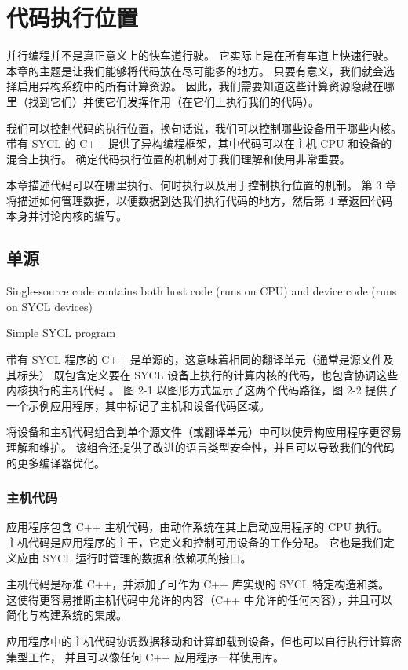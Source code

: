 \section{代码执行位置}
并行编程并不是真正意义上的快车道行驶。 它实际上是在所有车道上快速行驶。 本章的主题是让我们能够将代码放在尽可能多的地方。 
只要有意义，我们就会选择启用异构系统中的所有计算资源。 
因此，我们需要知道这些计算资源隐藏在哪里（找到它们）并使它们发挥作用（在它们上执行我们的代码）。

我们可以控制代码的执行位置，换句话说，我们可以控制哪些设备用于哪些内核。 
带有 SYCL 的 C++ 提供了异构编程框架，其中代码可以在主机 CPU 和设备的混合上执行。 
确定代码执行位置的机制对于我们理解和使用非常重要。

本章描述代码可以在哪里执行、何时执行以及用于控制执行位置的机制。 
第 3 章将描述如何管理数据，以便数据到达我们执行代码的地方，然后第 4 章返回代码本身并讨论内核的编写。


\subsection{单源}
{\color{red} Single-source code contains both host code (runs on CPU) and device code (runs on SYCL devices) }

{\color{red} Simple SYCL program }

带有 SYCL 程序的 C++ 是单源的，这意味着相同的翻译单元（通常是源文件及其标头）
既包含定义要在 SYCL 设备上执行的计算内核的代码，也包含协调这些内核执行的主机代码 。 
图 2-1 以图形方式显示了这两个代码路径，图 2-2 提供了一个示例应用程序，其中标记了主机和设备代码区域。

将设备和主机代码组合到单个源文件（或翻译单元）中可以使异构应用程序更容易理解和维护。 
该组合还提供了改进的语言类型安全性，并且可以导致我们的代码的更多编译器优化。

\subsubsection{主机代码}
应用程序包含 C++ 主机代码，由动作系统在其上启动应用程序的 CPU 执行。 
主机代码是应用程序的主干，它定义和控制可用设备的工作分配。 它也是我们定义应由 SYCL 运行时管理的数据和依赖项的接口。

主机代码是标准 C++，并添加了可作为 C++ 库实现的 SYCL 特定构造和类。 
这使得更容易推断主机代码中允许的内容（C++ 中允许的任何内容），并且可以简化与构建系统的集成。

应用程序中的主机代码协调数据移动和计算卸载到设备，但也可以自行执行计算密集型工作，
并且可以像任何 C++ 应用程序一样使用库。


